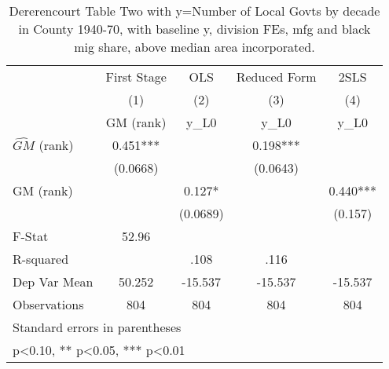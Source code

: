 \begin{table}[htbp]\centering
\def\sym#1{\ifmmode^{#1}\else\(^{#1}\)\fi}
\caption{Dererencourt Table Two with y=Number of Local Govts by decade in County 1940-70, with baseline y, division FEs, mfg and black mig share, above median area incorporated.}
\begin{tabular}{l*{4}{c}}
\toprule
                    & First Stage   &         OLS   &Reduced Form   &        2SLS   \\
                    &\multicolumn{1}{c}{(1)}&\multicolumn{1}{c}{(2)}&\multicolumn{1}{c}{(3)}&\multicolumn{1}{c}{(4)}\\
                    &\multicolumn{1}{c}{GM  (rank)}&\multicolumn{1}{c}{y\_L0}&\multicolumn{1}{c}{y\_L0}&\multicolumn{1}{c}{y\_L0}\\
\midrule
$\hat{GM}$ (rank)   &       0.451***&               &       0.198***&               \\
                    &    (0.0668)   &               &    (0.0643)   &               \\
\addlinespace
GM  (rank)          &               &       0.127*  &               &       0.440***\\
                    &               &    (0.0689)   &               &     (0.157)   \\
\midrule
F-Stat              &       52.96   &               &               &               \\
R-squared           &               &        .108   &        .116   &               \\
Dep Var Mean        &      50.252   &     -15.537   &     -15.537   &     -15.537   \\
Observations        &         804   &         804   &         804   &         804   \\
\bottomrule
\multicolumn{5}{l}{\footnotesize Standard errors in parentheses}\\
\multicolumn{5}{l}{\footnotesize * p<0.10, ** p<0.05, *** p<0.01}\\
\end{tabular}
\end{table}
